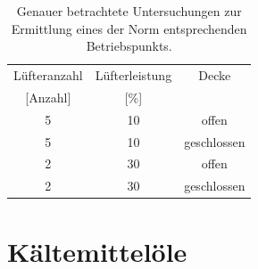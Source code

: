 \begin{table}[h!]
\centering
\caption{Genauer betrachtete Untersuchungen zur Ermittlung eines der Norm entsprechenden Betriebspunkts.}
\label{tab:Lüfterleistungen_eingegrenzt}
\begin{tabular}{|ccc|}
\hline
Lüfteranzahl            & Lüfterleistung          & Decke       \\
{[}Anzahl{]}            & {[}\%{]}                &             \\ \hline
\multicolumn{1}{|c|}{5} & \multicolumn{1}{c|}{10} & offen       \\
\multicolumn{1}{|c|}{5} & \multicolumn{1}{c|}{10} & geschlossen \\
\multicolumn{1}{|c|}{2} & \multicolumn{1}{c|}{30} & offen       \\
\multicolumn{1}{|c|}{2} & \multicolumn{1}{c|}{30} & geschlossen \\ \hline
\end{tabular}
\end{table}





\section{Kältemittelöle}
\label{sec:Kältemittelöleanalyse}

